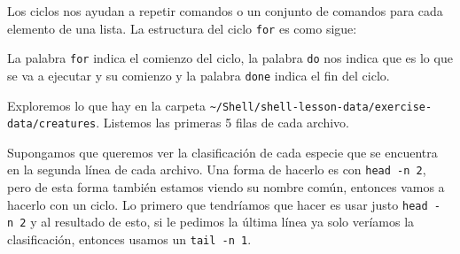 \documentclass[
]{book}
\newenvironment{Shaded}{\begin{snugshade}}{\end{snugshade}}
\newcommand{\AttributeTok}[1]{\textcolor[rgb]{0.13,0.29,0.53}{#1}}
\newcommand{\ControlFlowTok}[1]{\textcolor[rgb]{0.13,0.29,0.53}{\textbf{#1}}}
\newcommand{\ExtensionTok}[1]{#1}
\newcommand{\FunctionTok}[1]{\textcolor[rgb]{0.13,0.29,0.53}{\textbf{#1}}}
\newcommand{\KeywordTok}[1]{\textcolor[rgb]{0.13,0.29,0.53}{\textbf{#1}}}
\newcommand{\NormalTok}[1]{#1}
\newcommand{\OperatorTok}[1]{\textcolor[rgb]{0.81,0.36,0.00}{\textbf{#1}}}
\newcommand{\PreprocessorTok}[1]{\textcolor[rgb]{0.56,0.35,0.01}{\textit{#1}}}
\newcommand{\VariableTok}[1]{\textcolor[rgb]{0.00,0.00,0.00}{#1}}
\begin{document}
Los ciclos nos ayudan a repetir comandos o un conjunto de comandos para cada elemento de una lista. La estructura del ciclo \texttt{for} es como sigue:

\begin{Shaded}
\end{Shaded}

La palabra \texttt{for} indica el comienzo del ciclo, la palabra \texttt{do} nos indica que es lo que se va a ejecutar y su comienzo y la palabra \texttt{done} indica el fin del ciclo.

Exploremos lo que hay en la carpeta \texttt{\textasciitilde{}/Shell/shell-lesson-data/exercise-data/creatures}. Listemos las primeras 5 filas de cada archivo.

\begin{Shaded}
\end{Shaded}

Supongamos que queremos ver la clasificación de cada especie que se encuentra en la segunda línea de cada archivo. Una forma de hacerlo es con \texttt{head\ -n\ 2}, pero de esta forma también estamos viendo su nombre común, entonces vamos a hacerlo con un ciclo. Lo primero que tendríamos que hacer es usar justo \texttt{head\ -n\ 2} y al resultado de esto, si le pedimos la última línea ya solo veríamos la clasificación, entonces usamos un \texttt{tail\ -n\ 1}.

\begin{Shaded}
\end{Shaded}
\end{document}
